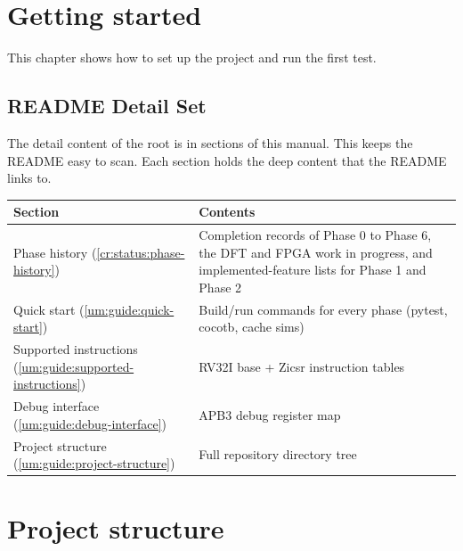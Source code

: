 \chapter{Getting started}\label{um:ch:getting-started}

This chapter shows how to set up the project and run the first test.

\section{README Detail Set}\label{um:guide:readme-index}

The detail content of the root  is in sections of this manual.
This keeps the README easy to scan.
Each section holds the deep content that the README links to.

{
\begin{longtable}[]{@{}
  >{\raggedright\arraybackslash}p{}
  >{\raggedright\arraybackslash}p{}@{}}
\toprule\noalign{}
\begin{minipage}[b]{\linewidth}\raggedright
Section
\end{minipage} & \begin{minipage}[b]{\linewidth}\raggedright
Contents
\end{minipage} \\
\midrule\noalign{}
\endhead
\bottomrule\noalign{}
\endlastfoot
Phase history (\cref{cr:status:phase-history}) & Completion records of Phase 0 to Phase 6, the DFT and FPGA work in progress, and
implemented-feature lists for Phase 1 and Phase 2 \\
Quick start (\cref{um:guide:quick-start}) & Build/run
commands for every phase (pytest, cocotb, cache sims) \\
Supported instructions (\cref{um:guide:supported-instructions})
& RV32I base + Zicsr instruction tables \\
Debug interface (\cref{um:guide:debug-interface}) &
APB3 debug register map \\
Project structure (\cref{um:guide:project-structure}) &
Full repository directory tree \\
\end{longtable}
}

\chapter{Project structure}\label{um:ch:project-structure}

